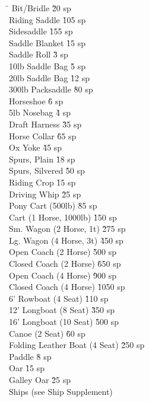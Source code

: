 \begin{multicols}{3}
{\begin{tabbing}
\hspace{0.8\linewidth}\= \kill
Bit/Bridle			\` 20 sp \\
Riding Saddle			\` 105 sp \\
Sidesaddle			\` 155 sp \\
Saddle Blanket			\` 15 sp \\
Saddle Roll			\` 3 sp \\
10lb Saddle Bag			\` 5 sp \\
20lb Saddle Bag			\` 12 sp \\
300lb Packsaddle			\` 80 sp \\
Horseshoe			\` 6 sp \\
5lb Nosebag			\` 4 sp \\
Draft Harness			\` 35 sp \\
Horse Collar			\` 65 sp \\
Ox Yoke			\` 45 sp \\
Spurs, Plain			\` 18 sp \\
Spurs, Silvered			\` 50 sp \\
Riding Crop			\` 15 sp \\
Driving Whip			\` 25 sp \\
Pony Cart (500lb)			\` 85 sp \\
Cart (1 Horse, 1000lb)			\` 150 sp \\
Sm. Wagon (2 Horse, 1t)			\` 275 sp \\
Lg. Wagon (4 Horse, 3t)			\` 450 sp \\
Open Coach (2 Horse)			\` 500 sp \\
Closed Coach (2 Horse)			\` 650 sp \\
Open Coach (4 Horse)			\` 900 sp \\
Closed Coach (4 Horse)			\` 1050 sp \\
6' Rowboat (4 Seat)			\` 110 sp \\
12' Longboat (8 Seat)			\` 350 sp \\
16' Longboat (10 Seat)			\` 500 sp \\
Canoe (2 Seat)			\` 60 sp \\
Folding Leather Boat (4 Seat)			\` 250 sp \\
Paddle			\` 8 sp \\
Oar			\` 15 sp \\
Galley Oar			\` 25 sp \\
Ships (see Ship Supplement)			\` \\
\end{tabbing}

}
\end{multicols}

